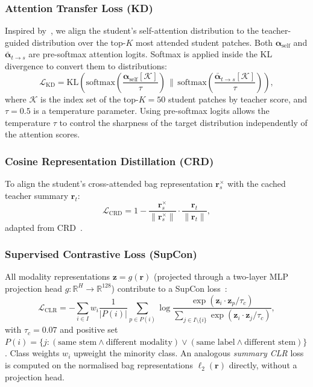 \documentclass[11pt,a4paper]{article}
\begin{document}
\subsubsection{Attention Transfer Loss (KD)}

Inspired by~\cite{zagoruyko2017at}, we align the student's self-attention
distribution to the teacher-guided distribution over the top-$K$ most attended
student patches.
Both $\boldsymbol{\alpha}_\text{self}$ and $\bar{\boldsymbol{\alpha}}_{t\to s}$
are pre-softmax attention logits.
Softmax is applied inside the KL divergence to convert them to distributions:
\begin{equation}
    \mathcal{L}_\text{KD} =
    \mathrm{KL}\!\left(
        \text{softmax}\!\left(\frac{\boldsymbol{\alpha}_\text{self}[\mathcal{K}]}{\tau}\right)
        \,\Big\|\,
        \text{softmax}\!\left(\frac{\bar{\boldsymbol{\alpha}}_{t\to s}[\mathcal{K}]}{\tau}\right)
    \right),
    \label{eq:kd}
\end{equation}
where $\mathcal{K}$ is the index set of the top-$K=50$ student patches by
teacher score, and $\tau=0.5$ is a temperature parameter.
Using pre-softmax logits allows the temperature $\tau$ to control the
sharpness of the target distribution independently of the attention scores.

\subsubsection{Cosine Representation Distillation (CRD)}

To align the student's cross-attended bag representation
$\mathbf{r}_s^\times$ with the cached teacher summary $\mathbf{r}_t$:
\begin{equation}
    \mathcal{L}_\text{CRD} = 1 - \frac{\mathbf{r}_s^\times}{\|\mathbf{r}_s^\times\|}
        \cdot\frac{\mathbf{r}_t}{\|\mathbf{r}_t\|},
    \label{eq:crd}
\end{equation}
adapted from CRD~\cite{tian2020crd}.

\subsubsection{Supervised Contrastive Loss (SupCon)}

All modality representations $\mathbf{z} = g(\mathbf{r})$ (projected through a
two-layer MLP projection head $g:\mathbb{R}^H\to\mathbb{R}^{128}$) contribute
to a SupCon loss~\cite{khosla2020supcon}:
\begin{equation}
    \mathcal{L}_\text{CLR} =
    -\sum_{i\in I} w_i
    \frac{1}{|P(i)|}\sum_{p\in P(i)}
    \log\frac{\exp(\mathbf{z}_i\cdot\mathbf{z}_p/\tau_c)}
             {\sum_{j\in I\setminus\{i\}}\exp(\mathbf{z}_i\cdot\mathbf{z}_j/\tau_c)},
    \label{eq:supcon}
\end{equation}
with $\tau_c = 0.07$ and positive set
$P(i) = \{j : (\text{same stem} \wedge \text{different modality}) \vee
             (\text{same label} \wedge \text{different stem})\}$.
Class weights $w_i$ upweight the minority class.
An analogous \emph{summary CLR} loss is computed on the normalised bag
representations $\ell_2(\mathbf{r})$ directly, without a projection head.
\end{document}
